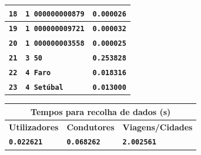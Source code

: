 \documentclass[12pt,a4paper]{report}
\begin{document}
\begin{tabularx}{\textwidth} { 
  | >{\centering\arraybackslash}X 
  | >{\centering\arraybackslash}X 
  | >{\centering\arraybackslash}X | }
 \hline
 \texttt{\textbf{18}} & \texttt{\textbf{1 000000000879}}  & \texttt{\textbf{0.000026}}  \\
 \hline
 \texttt{\textbf{19}} & \texttt{\textbf{1 000000009721}}  & \texttt{\textbf{0.000032}}  \\
 \hline
 \texttt{\textbf{20}} & \texttt{\textbf{1 000000003558}}  & \texttt{\textbf{0.000025}}  \\
 \hline
 \texttt{\textbf{21}} & \texttt{\textbf{3 50}}  & \texttt{\textbf{0.253828}}  \\
 \hline
 \texttt{\textbf{22}} & \texttt{\textbf{4 Faro}}  & \texttt{\textbf{0.018316}}  \\
 \hline
 \texttt{\textbf{23}} & \texttt{\textbf{4 Setúbal}}  & \texttt{\textbf{0.013000}}  \\
 \hline
\end{tabularx}

\vspace{15pt}
\begin{center}
\begin{tabular}{ |p{4.73cm}|p{4.73cm}|p{4.73cm}|  }
 \hline
 \multicolumn{3}{|c|}{\textbf{Tempos para recolha de dados (s)}} \\
 \hline
 \centering\textbf{Utilizadores} & \hfil \textbf{Condutores} & \hfil \textbf{Viagens/Cidades} \\
 \hline
 \centering\textbf{\texttt{0.022621}} & \hfil \texttt{\textbf{0.068262}} & \hfil \texttt{\textbf{2.002561}}\\
 \hline
\end{tabular}
\end{center}
\end{document}
